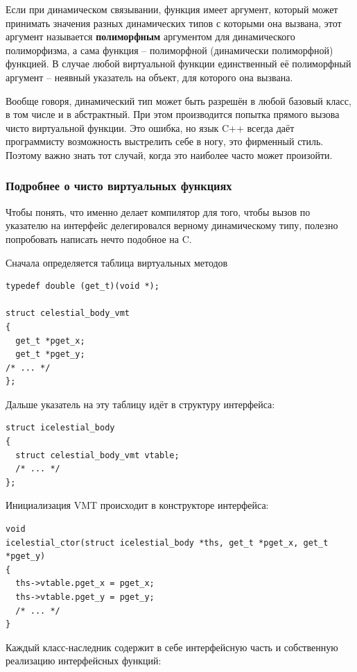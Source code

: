 \documentclass[a4paper,12pt,oneside]{article}
\begin{document}
Если при динамическом связывании, функция имеет аргумент, который может принимать значения разных динамических типов с которыми она вызвана, этот аргумент называется \textbf{полиморфным} аргументом для динамического полиморфизма, а сама функция -- полиморфной (динамически полиморфной) функцией. В случае любой виртуальной функции единственный её полиморфный аргумент -- неявный указатель на объект, для которого она вызвана.

Вообще говоря, динамический тип может быть разрешён в любой базовый класс, в том числе и в абстрактный. При этом производится попытка прямого вызова чисто виртуальной функции. Это ошибка, но язык C++ всегда даёт программисту возможность выстрелить себе в ногу, это фирменный стиль. Поэтому важно знать тот случай, когда это наиболее часто может произойти.

\subsubsection{Подробнее о чисто виртуальных функциях}\label{VirtualUnderHood}

Чтобы понять, что именно делает компилятор для того, чтобы вызов по указателю на интерфейс делегировался верному динамическому типу, полезно попробовать написать нечто подобное на C.

Сначала определяется таблица виртуальных методов

\begin{lstlisting}
typedef double (get_t)(void *);

struct celestial_body_vmt
{
  get_t *pget_x;
  get_t *pget_y;
/* ... */
};
\end{lstlisting}

Дальше указатель на эту таблицу идёт в структуру интерфейса:

\begin{lstlisting}
struct icelestial_body
{
  struct celestial_body_vmt vtable;
  /* ... */
};
\end{lstlisting}

Инициализация VMT происходит в конструкторе интерфейса:

\begin{lstlisting}
void
icelestial_ctor(struct icelestial_body *ths, get_t *pget_x, get_t *pget_y)
{
  ths->vtable.pget_x = pget_x;
  ths->vtable.pget_y = pget_y;
  /* ... */
}
\end{lstlisting}

Каждый класс-наследник содержит в себе интерфейсную часть и собственную реализацию интерфейсных функций:
\end{document}
